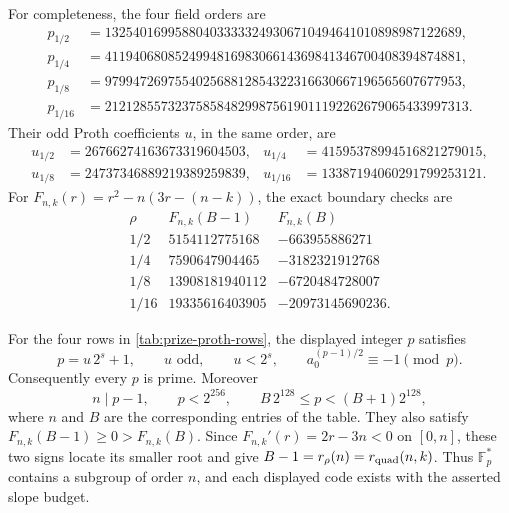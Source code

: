 \documentclass[11pt,a4paper]{amsart}
\numberwithin{equation}{section}
\theoremstyle{remark}
\newcommand{\F}{\mathbb F}\newcommand{\B}{\mathbb B}\newcommand{\K}{\mathbb K}\newcommand{\Z}{\mathbb Z}
\begin{document}
For completeness, the four field orders are
\begin{align*}
p_{1/2}&=132540169958804033333249306710494641010898987122689,\\
p_{1/4}&=411940680852499481698306614369841346700408394874881,\\
p_{1/8}&=979947269755402568812854322316630667196565607677953,\\
p_{1/16}&=2121285573237585848299875619011192262679065433997313.
\end{align*}
Their odd Proth coefficients \(u\), in the same order, are
\begin{align*}
u_{1/2}&=26766274163673319604503,
&u_{1/4}&=41595378994516821279015,\\
u_{1/8}&=24737346889219389259839,
&u_{1/16}&=13387194060291799253121.
\end{align*}
For \(F_{n,k}(r)=r^2-n(3r-(n-k))\), the exact boundary checks are
\[
\begin{array}{c|r|r}
 \rho&F_{n,k}(B-1)&F_{n,k}(B)\\ \hline
 1/2&5154112775168&-663955886271\\
 1/4&7590647904465&-3182321912768\\
 1/8&13908181940112&-6720484728007\\
 1/16&19335616403905&-20973145690236.
\end{array}                                                    \tag{PC0}
\label{eq:quadratic-row-certificates}
\]

\begin{proposition}
\label{prop:proth-row-check}
For the four rows in \cref{tab:prize-proth-rows}, the displayed integer
\(p\) satisfies
\[
 p=u\,2^s+1,\qquad u\text{ odd},\qquad u<2^s,\qquad
 a_0^{(p-1)/2}\equiv-1\pmod p.                  \tag{PC1}
\label{eq:proth-certificates}
\]
Consequently every \(p\) is prime.  Moreover
\[
 n\mid p-1,\qquad p<2^{256},\qquad
 B\,2^{128}\le p<(B+1)2^{128},                  \tag{PC2}
\label{eq:prize-row-arithmetic}
\]
where \(n\) and \(B\) are the corresponding entries of the table.
They also satisfy \(F_{n,k}(B-1)\ge0>F_{n,k}(B)\).  Since
\(F_{n,k}'(r)=2r-3n<0\) on \([0,n]\), these two signs locate its smaller
root and give \(B-1=r_\rho(n)=r_{\rm quad}(n,k)\).
Thus \(\F_p^*\) contains a subgroup of order \(n\), and each displayed code exists with the asserted slope budget.
\end{proposition}
\end{document}
